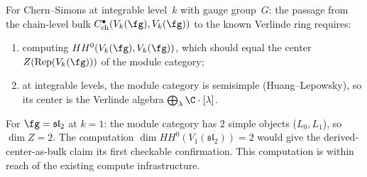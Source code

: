 \begin{remark}
\label{rem:checkable-bulk-computation}
For Chern--Simons at integrable level~$k$ with gauge group~$G$:
the passage from the chain-level bulk
$C^\bullet_{\mathrm{ch}}(V_k(\fg), V_k(\fg))$ to the known
Verlinde ring requires:
\begin{enumerate}[label=\textup{(\roman*)}]
\item computing $HH^0(V_k(\fg), V_k(\fg))$, which should equal
 the center $Z(\operatorname{Rep}(V_k(\fg)))$ of the
 module category;
\item at integrable levels, the module category is semisimple
 (Huang--Lepowsky), so its center is the Verlinde algebra
 $\bigoplus_\lambda \C \cdot [\lambda]$.
\end{enumerate}
For $\fg = \mathfrak{sl}_2$ at $k = 1$: the module category has
$2$ simple objects ($L_0, L_1$), so $\dim Z = 2$. The
computation $\dim HH^0(V_1(\mathfrak{sl}_2)) = 2$ would give
the derived-center-as-bulk claim its first checkable confirmation.
This computation is within reach of the existing compute
infrastructure.
\end{remark}

